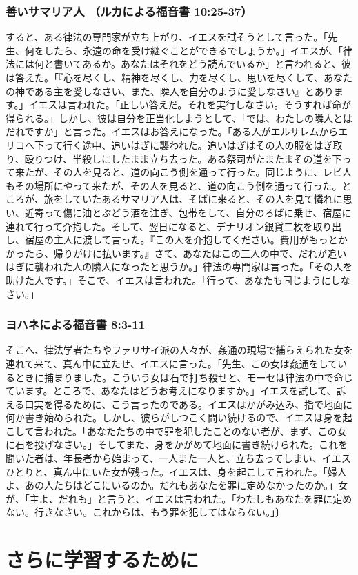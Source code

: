 \documentclass[uplatex,dvipdfmx]{jsarticle} \usepackage{mystyle}%
\begin{document}
\subsubsection*{善いサマリア人 （ルカによる福音書 10:25-37）}


すると、ある律法の専門家が立ち上がり、イエスを試そうとして言った。「先生、何をしたら、永遠の命を受け継ぐことができるでしょうか。」イエスが、「律法には何と書いてあるか。あなたはそれをどう読んでいるか」と言われると、彼は答えた。「『心を尽くし、精神を尽くし、力を尽くし、思いを尽くして、あなたの神である主を愛しなさい、また、隣人を自分のように愛しなさい』とあります。」イエスは言われた。「正しい答えだ。それを実行しなさい。そうすれば命が得られる。」しかし、彼は自分を正当化しようとして、「では、わたしの隣人とはだれですか」と言った。イエスはお答えになった。「ある人がエルサレムからエリコへ下って行く途中、追いはぎに襲われた。追いはぎはその人の服をはぎ取り、殴りつけ、半殺しにしたまま立ち去った。ある祭司がたまたまその道を下って来たが、その人を見ると、道の向こう側を通って行った。同じように、レビ人もその場所にやって来たが、その人を見ると、道の向こう側を通って行った。ところが、旅をしていたあるサマリア人は、そばに来ると、その人を見て憐れに思い、近寄って傷に油とぶどう酒を注ぎ、包帯をして、自分のろばに乗せ、宿屋に連れて行って介抱した。そして、翌日になると、デナリオン銀貨二枚を取り出し、宿屋の主人に渡して言った。『この人を介抱してください。費用がもっとかかったら、帰りがけに払います。』さて、あなたはこの三人の中で、だれが追いはぎに襲われた人の隣人になったと思うか。」律法の専門家は言った。「その人を助けた人です。」そこで、イエスは言われた。「行って、あなたも同じようにしなさい。」


\subsubsection*{ヨハネによる福音書 8:3-11}


そこへ、律法学者たちやファリサイ派の人々が、姦通の現場で捕らえられた女を連れて来て、真ん中に立たせ、イエスに言った。「先生、この女は姦通をしているときに捕まりました。こういう女は石で打ち殺せと、モーセは律法の中で命じています。ところで、あなたはどうお考えになりますか。」イエスを試して、訴える口実を得るために、こう言ったのである。イエスはかがみ込み、指で地面に何か書き始められた。しかし、彼らがしつこく問い続けるので、イエスは身を起こして言われた。「あなたたちの中で罪を犯したことのない者が、まず、この女に石を投げなさい。」そしてまた、身をかがめて地面に書き続けられた。これを聞いた者は、年長者から始まって、一人また一人と、立ち去ってしまい、イエスひとりと、真ん中にいた女が残った。イエスは、身を起こして言われた。「婦人よ、あの人たちはどこにいるのか。だれもあなたを罪に定めなかったのか。」女が、「主よ、だれも」と言うと、イエスは言われた。「わたしもあなたを罪に定めない。行きなさい。これからは、もう罪を犯してはならない。」〕





\section{さらに学習するために}


\fi



\ifx\mybook\undefined



\end{document}
